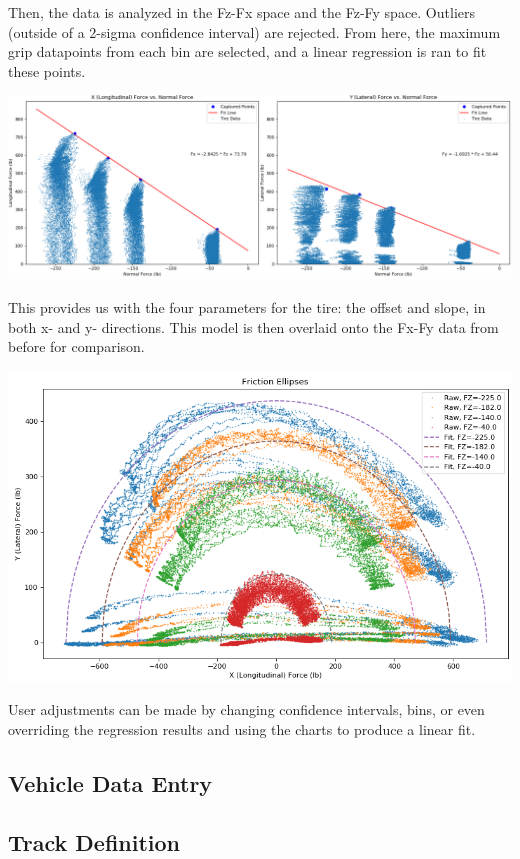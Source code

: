 \documentclass{article}
\begin{document}
Then, the data is analyzed in the Fz-Fx space and the Fz-Fy space. Outliers (outside of a 2-sigma confidence interval) are rejected. From here, the maximum grip datapoints from each bin are selected, and a linear regression is ran to fit these points.

\includegraphics[width=\textwidth]{fric_regression.png}

This provides us with the four parameters for the tire: the offset and slope, in both x- and y- directions. This model is then overlaid onto the Fx-Fy data from before for comparison.

\includegraphics[width=\textwidth]{fric_ellipses_fit.png}

User adjustments can be made by changing confidence intervals, bins, or even overriding the regression results and using the charts to produce a linear fit.

\subsection{Vehicle Data Entry}

\subsection{Track Definition}
\end{document}
